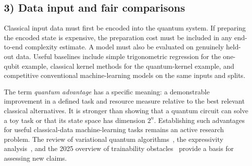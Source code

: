 \subsection*{3) Data input and fair comparisons}
Classical input data must first be encoded into the quantum system. If preparing the encoded state is expensive, the preparation cost must be included in any end-to-end complexity estimate. A model must also be evaluated on genuinely held-out data. Useful baselines include simple trigonometric regression for the one-qubit example, classical kernel methods for the quantum-kernel example, and competitive conventional machine-learning models on the same inputs and splits.

The term \emph{quantum advantage} has a specific meaning: a demonstrable improvement in a defined task and resource measure relative to the best relevant classical alternatives. It is stronger than showing that a quantum circuit can solve a toy task or that its state space has dimension $2^n$. Establishing such advantages for useful classical-data machine-learning tasks remains an active research problem. The review of variational quantum algorithms~\cite{Cerezo2021}, the expressivity analysis~\cite{SchuldSwekeMeyer2021}, and the 2025 overview of trainability obstacles~\cite{Larocca2025} provide a basis for assessing new claims.



